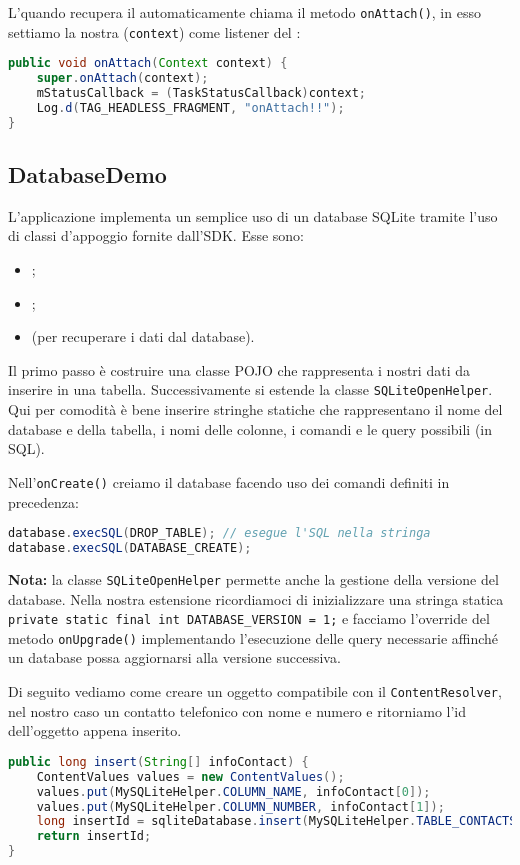 L'\Activity quando recupera il \Fragment automaticamente chiama il metodo \texttt{onAttach()}, in esso settiamo la nostra \Activity (\lstinline|context|) come listener del \Fragment:

\begin{lstlisting}[language=Java]
public void onAttach(Context context) {
	super.onAttach(context);
	mStatusCallback = (TaskStatusCallback)context;
	Log.d(TAG_HEADLESS_FRAGMENT, "onAttach!!");
}
\end{lstlisting}

\subsection{DatabaseDemo}
L'applicazione implementa un semplice uso di un database SQLite tramite l'uso di classi d'appoggio fornite dall'SDK. Esse sono:
\begin{itemize}
	\item \SQLiteDatabase;
	\item \SQLiteOpenHelper;
	\item \Cursor (per recuperare i dati dal database).
\end{itemize}

Il primo passo è costruire una classe POJO che rappresenta i nostri dati da inserire in una tabella. Successivamente si estende la classe \lstinline|SQLiteOpenHelper|. Qui per comodità è bene inserire stringhe statiche che rappresentano il nome del database e della tabella, i nomi delle colonne, i comandi e le query possibili (in SQL).

Nell'\lstinline|onCreate()| creiamo il database facendo uso dei comandi definiti in precedenza:

\begin{lstlisting}[language=Java]
database.execSQL(DROP_TABLE); // esegue l'SQL nella stringa
database.execSQL(DATABASE_CREATE);
\end{lstlisting}

\textbf{Nota:} la classe \lstinline|SQLiteOpenHelper| permette anche la gestione della versione del database. Nella nostra estensione ricordiamoci di inizializzare una stringa statica \lstinline|private static final int DATABASE_VERSION = 1;| e facciamo l'override del metodo \lstinline|onUpgrade()| implementando l'esecuzione delle query necessarie affinché un database possa aggiornarsi alla versione successiva.

Di seguito vediamo come creare un oggetto compatibile con il \lstinline|ContentResolver|, nel nostro caso un contatto telefonico con nome e numero e ritorniamo l'id dell'oggetto appena inserito.
\begin{lstlisting}[language=Java]
public long insert(String[] infoContact) {
	ContentValues values = new ContentValues();
	values.put(MySQLiteHelper.COLUMN_NAME, infoContact[0]);
	values.put(MySQLiteHelper.COLUMN_NUMBER, infoContact[1]);
	long insertId = sqliteDatabase.insert(MySQLiteHelper.TABLE_CONTACTS, null, values);
	return insertId;
}
\end{lstlisting}

